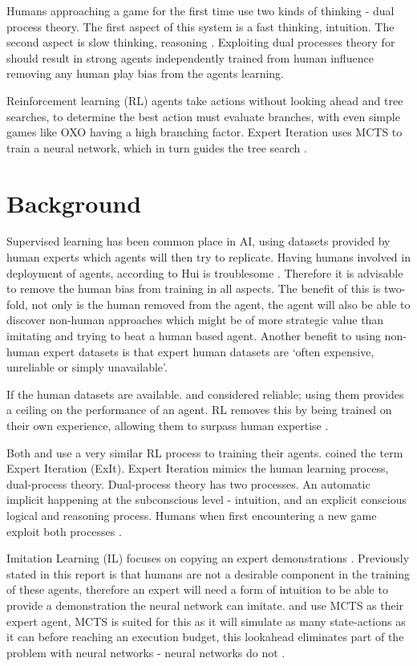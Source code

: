 \documentclass[conference]{IEEEtran}
\begin{document}
Humans approaching a game for the first time use two kinds of thinking - dual process theory. The first aspect of this system is a fast thinking, intuition. The second aspect is slow thinking, reasoning \cite{ExpertIteration}. Exploiting dual processes theory for should result in strong agents independently trained from human influence removing any human play bias from the agents learning.

Reinforcement learning (RL) agents take actions without looking ahead and tree searches, to determine the best action must evaluate branches, with even simple games like OXO having a high branching factor. Expert Iteration uses MCTS to train a neural network, which in turn guides the tree search \cite{ExpertIteration}.  

\section{Background}
Supervised learning has been common place in AI, using datasets provided by human experts which agents will then try to replicate. Having humans involved in deployment of agents, according to Hui is troublesome \cite{huiil}. Therefore it is advisable to remove the human bias from training in all aspects. The benefit of this is two-fold, not only is the human removed from the agent, the agent will also be able to discover non-human approaches which might be of more strategic value than imitating and trying to beat a human based agent. Another benefit to using non-human expert datasets is that expert human datasets are `often expensive, unreliable or simply unavailable'\cite{go}.

If the human datasets are available. and considered reliable; using them provides a ceiling on the performance of an agent. RL removes this by being trained on their own experience, allowing them to surpass human expertise \cite{go}.  

Both \cite{ExpertIteration} and \cite{go} use a very similar RL process to training their agents. \cite{ExpertIteration} coined the term Expert Iteration (ExIt). Expert Iteration mimics the human learning process, dual-process theory. Dual-process theory has two processes. An automatic implicit happening at the subconscious level - intuition, and an explicit conscious logical and reasoning process. Humans when first encountering a new game exploit both processes \cite{dualprocess}.

Imitation Learning (IL) focuses on copying an expert demonstrations \cite{huiil}. Previously stated in this report is that humans are not a desirable component in the training of these agents, therefore an expert will need a form of intuition to be able to provide a demonstration the neural network can imitate. \cite{ExpertIteration} and \cite{go} use MCTS as their expert agent, MCTS is suited for this as it will simulate as many state-actions as it can before reaching an execution budget, this lookahead eliminates part of the problem with neural networks - neural networks do not \cite{ExpertIteration}. 
\end{document}
